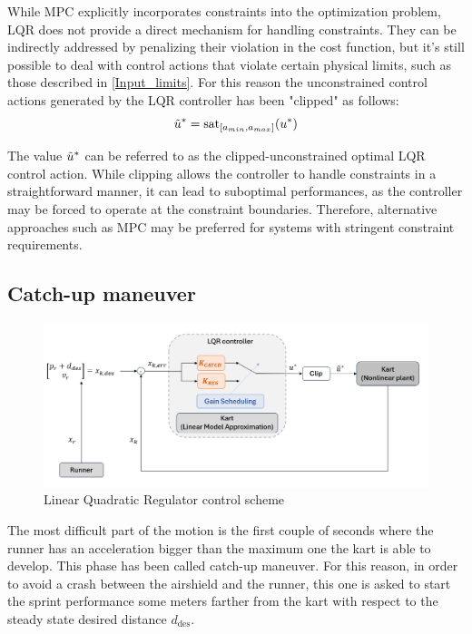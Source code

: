 \documentclass[a4paper,12pt,oneside]{book}
\begin{document}
\bigskip
While MPC explicitly incorporates constraints into the optimization problem, LQR does not provide a direct mechanism for handling constraints.
They can be indirectly addressed by penalizing their violation in the cost function, but it's still possible to deal with control actions that violate certain physical limits, such as those described in \ref{Input_limits}.
For this reason the unconstrained control actions generated by the LQR controller has been "clipped" as follows:
\begin{equation}
    \Tilde{u}^* = \text{sat}_{[a_{min}, a_{max}]} (u^*)
\end{equation}

The value $\Tilde{u}^*$ can be referred to as the clipped-unconstrained optimal LQR control action.
While clipping allows the controller to handle constraints in a straightforward  manner, it can lead to suboptimal performances, as the controller may be forced to operate at the constraint boundaries.
Therefore, alternative approaches such as MPC may be preferred for systems with stringent constraint requirements.

\subsection{Catch-up maneuver}
\begin{figure}
	\centering
	\includegraphics[width=1.0\textwidth]{LQR_sim_scheme.png}
	\caption{Linear Quadratic Regulator control scheme}
	\label{image:LQR_sim_scheme}
\end{figure}

The most difficult part of the motion is the first couple of seconds where the runner has an acceleration bigger than the maximum one the kart is able to develop. 
This phase has been called catch-up maneuver.
For this reason, in order to avoid a crash between the airshield and the runner, this one is asked to start the sprint performance some meters farther from the kart with respect to the steady state desired distance $d_{\text{des}}$.
\end{document}

